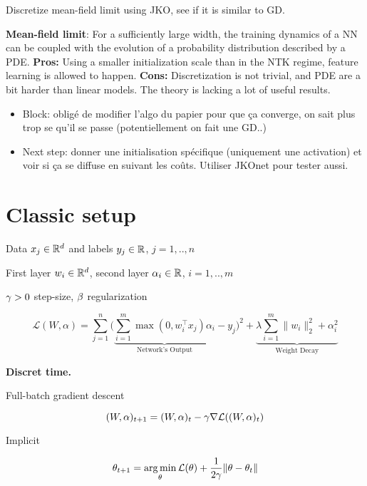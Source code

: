 Discretize mean-field limit using JKO, see if it is similar to GD.

\textbf{Mean-field limit}\citep{chizatGlobalConvergenceGradient2018}: For a sufficiently large width, the training dynamics of a NN can be coupled with the evolution of a probability distribution described by a PDE. \textbf{Pros:} Using a smaller initialization scale than in the NTK regime, feature learning is allowed to happen. \textbf{Cons:} Discretization is not trivial, and PDE are a bit harder than linear models. The theory is lacking a lot of useful results.

\begin{itemize}
	\item \colorbox{Thistle!40}{Block:} obligé de modifier l'algo du papier pour que ça converge, on sait plus trop se qu'il se passe (potentiellement on fait une GD..)
	\item \colorbox{Emerald!30}{Next step:} donner une initialisation spécifique (uniquement une activation) et voir si ça se diffuse en suivant les coûts. Utiliser JKOnet pour tester aussi.
\end{itemize}

\section{Classic setup}

Data $x_j \in \mathbb{R}^d$ and labels $y_j \in \mathbb{R}$, $j=1,..,n$

First layer $w_i \in \mathbb{R}^d$, second layer $\alpha_i \in \mathbb{R}$, $i=1,..,m$

$\gamma>0$ step-size, $\beta$ regularization

\begin{equation}
	 \mathcal{L}(W, \alpha) = \sum_{j=1}^n \bigg( \underbrace{\sum_{i=1}^m \max(0, w_i^\top x_j) \alpha_i}_{\text{Network's Output}} - y_j \bigg)^2 + \underbrace{\lambda \sum_{i=1}^m \| w_i \|^2_2 + \alpha_i^2}_{\text{Weight Decay}}
\end{equation}


\textbf{Discret time.}

Full-batch gradient descent

\begin{equation}
	(W, \alpha)_{t+1} = (W, \alpha)_t - \gamma \nabla \mathcal{L}((W, \alpha)_t)
\end{equation}

Implicit

\begin{equation}
	\theta_{t+1} = \operatorname*{arg\,min}_{\theta} \mathcal{L}(\theta) +\frac{1}{2\gamma} \lVert\theta - \theta_t\rVert
\end{equation}

